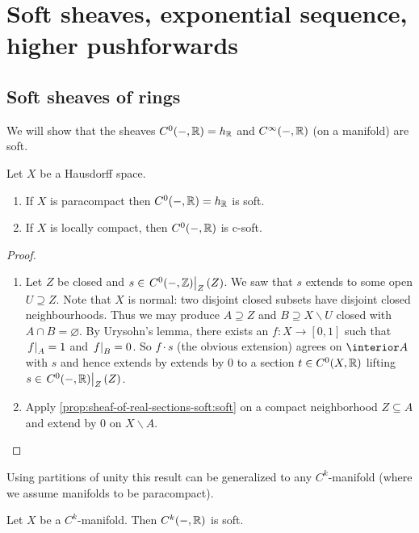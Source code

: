 \documentclass[../main.tex]{subfiles}
\begin{document}
\chapter{Soft sheaves, exponential sequence, higher pushforwards}

\section{Soft sheaves of rings}

We will show that the sheaves \(C^0(-,\mathbb{R})=h_{\mathbb{R}}\) and \(C^\infty(-,\mathbb{R})\) (on a manifold) are soft.

\begin{prop}
    Let $X$ be a Hausdorff space.
    \begin{enumerate}
        \item\label{prop:sheaf-of-real-sections-soft:soft} If $X$ is paracompact then $C^0(-, \mathbb{R}) = h_{\mathbb{R}}$ is soft.
        \item\label{prop:sheaf-of-real-sections-soft:c-soft} If $X$ is locally compact, then $C^0(-, \mathbb{R})$ is c-soft.
    \end{enumerate}
\end{prop}

\begin{proof}
    \begin{enumerate}
        \item Let $Z$ be closed and $s\in \left.C^0(-, \mathbb{Z})\right|_{Z}(Z)$. We saw that $s$ extends to some open $U\supseteq Z$. Note that $X$ is normal: two disjoint closed subsets have disjoint closed neighbourhoods. Thus we may produce $A\supseteq Z$ and $B\supseteq X\backslash U$ closed with $A\cap B = \varnothing$. By Urysohn's lemma, there exists an $f\colon X\to [0,1]$ such that $\left.f\right|_{A} = 1$ and $\left.f\right|_{B} = 0$. So $f\cdot s$ (the obvious extension) agrees on $\interior A$ with $s$ and hence extends by extends by $0$ to a section $t\in C^0(X, \mathbb{R})$ lifting $s\in \left.C^0(-, \mathbb{R})\right|_{Z}(Z)$. 
        \item Apply \cref{prop:sheaf-of-real-sections-soft:soft} on a compact neighborhood $Z\subseteq A$ and extend by $0$ on $X\backslash A$. \qedhere
    \end{enumerate}
\end{proof}

Using partitions of unity this result can be generalized to any $C^k$-manifold (where we assume manifolds to be paracompact).

\begin{prop}
    Let $X$ be a $C^k$-manifold. Then $C^k(-, \mathbb{R})$ is soft.
\end{prop}
\end{document}
